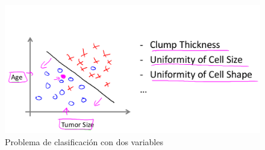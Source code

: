 \documentclass{report}
\begin{document}
\begin{figure}
	\includegraphics[scale=0.35]{img/Ej3}
	\caption{Problema de clasificación con dos variables}
	\label{fig:Ej3}
\end{figure}
\end{document}

